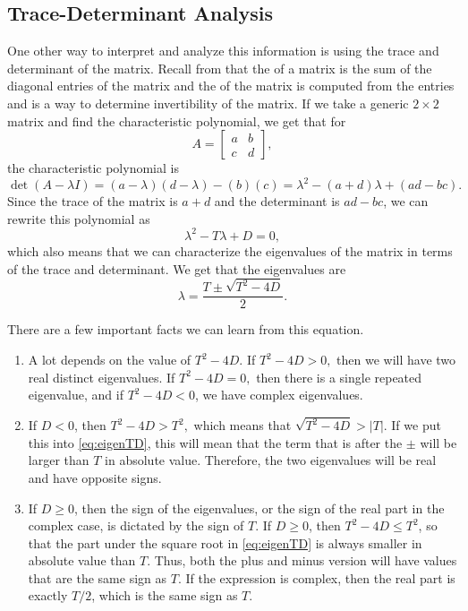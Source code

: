 \documentclass{ximera}
\begin{document}
\subsection{Trace-Determinant Analysis}

One other way to interpret and analyze this information is using the trace and determinant of the matrix. Recall from  that the  of a matrix is the sum of the diagonal entries of the matrix and the  of the matrix is computed from the entries and is a way to determine invertibility of the matrix. If we take a generic $2 \times 2$ matrix and find the characteristic polynomial, we get that for
\begin{equation*}
    A = \begin{bmatrix} a & b \\ c & d \end{bmatrix},
\end{equation*}
the characteristic polynomial is 
\begin{equation*}
    \det(A - \lambda I) = (a - \lambda)(d - \lambda) - (b)(c) = \lambda^2 - (a+d)\lambda + (ad-bc).
\end{equation*}
Since the trace of the matrix is $a+d$ and the determinant is $ad-bc$, we can rewrite this polynomial as
\begin{equation*}
    \lambda^2 - T\lambda + D = 0,
\end{equation*}
which also means that we can characterize the eigenvalues of the matrix in terms of the trace and determinant. We get that the eigenvalues are
\begin{equation}
    \lambda = \frac{T \pm \sqrt{T^2 - 4D}}{2}.
    \label{eq:eigenTD}
\end{equation}

There are a few important facts we can learn from this equation. 
\begin{enumerate}
    \item A lot depends on the value of $T^2 - 4D$. If $T^2 - 4D > 0,$ then we will have two real distinct eigenvalues. If $T^2 - 4D = 0,$ then there is a single repeated eigenvalue, and if $T^2 - 4D < 0$, we have complex eigenvalues.
    \item If $D < 0$, then $T^2 - 4D > T^2,$ which means that $\sqrt{T^2 - 4D} > |T|$. If we put this into \eqref{eq:eigenTD}, this will mean that the term that is after the $\pm$ will be larger than $T$ in absolute value. Therefore, the two eigenvalues will be real and have opposite signs.
    \item If $D \geq 0$, then the sign of the eigenvalues, or the sign of the real part in the complex case, is dictated by the sign of $T$. If $D \geq 0$, then $T^2 - 4D \leq T^2$, so that the part under the square root in \eqref{eq:eigenTD} is always smaller in absolute value than $T$. Thus, both the plus and minus version will have values that are the same sign as $T$. If the expression is complex, then the real part is exactly $T/2$, which is the same sign as $T$. 
\end{enumerate}
\end{document}

